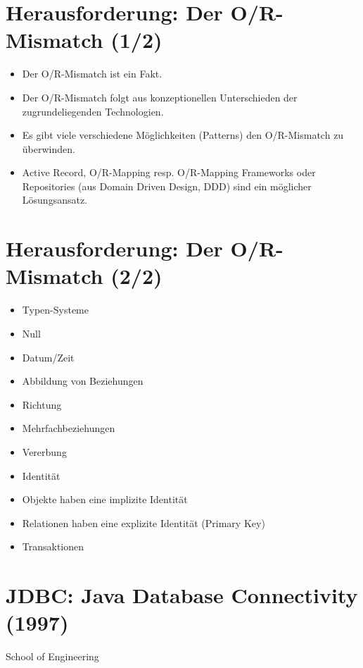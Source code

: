 \documentclass[10pt]{article}
\begin{document}
\section*{Herausforderung: Der O/R-Mismatch (1/2)}
\begin{itemize}
  \item Der O/R-Mismatch ist ein Fakt.
  \item Der O/R-Mismatch folgt aus konzeptionellen Unterschieden der zugrundeliegenden Technologien.
  \item Es gibt viele verschiedene Möglichkeiten (Patterns) den O/R-Mismatch zu überwinden.
  \item Active Record, O/R-Mapping resp. O/R-Mapping Frameworks oder Repositories (aus Domain Driven Design, DDD) sind ein möglicher Lösungsansatz.
\end{itemize}

\section*{Herausforderung: Der O/R-Mismatch (2/2)}
\begin{itemize}
  \item Typen-Systeme
  \item Null
  \item Datum/Zeit
  \item Abbildung von Beziehungen
  \item Richtung
  \item Mehrfachbeziehungen
  \item Vererbung
  \item Identität
  \item Objekte haben eine implizite Identität
  \item Relationen haben eine explizite Identität (Primary Key)
  \item Transaktionen
\end{itemize}

\section*{JDBC: Java Database Connectivity (1997)}
School of Engineering
\end{document}

